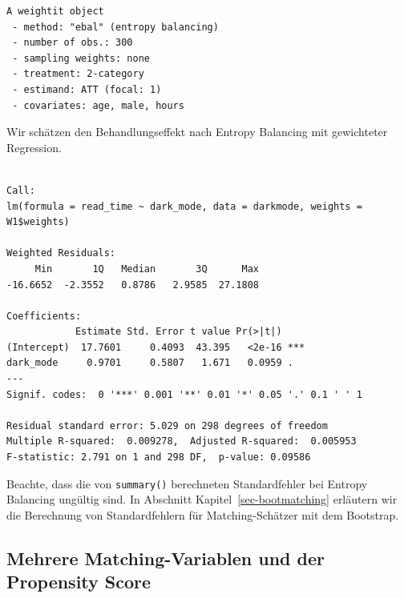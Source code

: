 \documentclass[
  a4paper,
  DIV=11,
  oneside]{scrreprt}
\newenvironment{Shaded}{\begin{snugshade}}{\end{snugshade}}
\newcommand{\AttributeTok}[1]{\textcolor[rgb]{0.40,0.45,0.13}{#1}}
\newcommand{\CommentTok}[1]{\textcolor[rgb]{0.37,0.37,0.37}{#1}}
\newcommand{\FunctionTok}[1]{\textcolor[rgb]{0.28,0.35,0.67}{#1}}
\newcommand{\NormalTok}[1]{\textcolor[rgb]{0.00,0.23,0.31}{#1}}
\newcommand{\OtherTok}[1]{\textcolor[rgb]{0.00,0.23,0.31}{#1}}
\newcommand{\SpecialCharTok}[1]{\textcolor[rgb]{0.37,0.37,0.37}{#1}}
\begin{document}
\begin{verbatim}
A weightit object
 - method: "ebal" (entropy balancing)
 - number of obs.: 300
 - sampling weights: none
 - treatment: 2-category
 - estimand: ATT (focal: 1)
 - covariates: age, male, hours
\end{verbatim}

Wir schätzen den Behandlungseffekt nach Entropy Balancing mit
gewichteter Regression.

\begin{Shaded}
\end{Shaded}

\begin{verbatim}

Call:
lm(formula = read_time ~ dark_mode, data = darkmode, weights = W1$weights)

Weighted Residuals:
     Min       1Q   Median       3Q      Max 
-16.6652  -2.3552   0.8786   2.9585  27.1808 

Coefficients:
            Estimate Std. Error t value Pr(>|t|)    
(Intercept)  17.7601     0.4093  43.395   <2e-16 ***
dark_mode     0.9701     0.5807   1.671   0.0959 .  
---
Signif. codes:  0 '***' 0.001 '**' 0.01 '*' 0.05 '.' 0.1 ' ' 1

Residual standard error: 5.029 on 298 degrees of freedom
Multiple R-squared:  0.009278,  Adjusted R-squared:  0.005953 
F-statistic: 2.791 on 1 and 298 DF,  p-value: 0.09586
\end{verbatim}

Beachte, dass die von \texttt{summary()} berechneten Standardfehler bei
Entropy Balancing ungültig sind. In Abschnitt
Kapitel~\ref{sec-bootmatching} erläutern wir die Berechnung von
Standardfehlern für Matching-Schätzer mit dem Bootstrap.

\subsection{Mehrere Matching-Variablen und der Propensity
Score}\label{sec-PSM}
\end{document}
